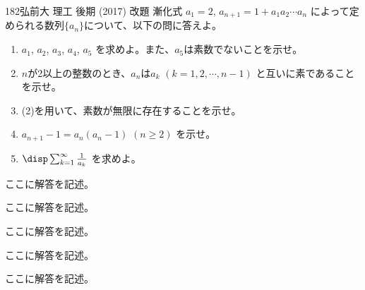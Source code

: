 \begin{thm}{182}{}{弘前大 理工 後期 (2017) 改題}
 漸化式 $a_1=2$, $a_{n+1}=1+a_1a_2\cdots a_n$ によって定められる数列$\{a_n\}$について、以下の問に答えよ。
 \begin{enumerate}
  \item $a_1$, $a_2$, $a_3$, $a_4$, $a_5$ を求めよ。また、$a_5$は素数でないことを示せ。
  \item $n$が2以上の整数のとき、$a_n$は$a_k$ $(k=1, 2, \cdots, n-1)$ と互いに素であることを示せ。
  \item (2)を用いて、素数が無限に存在することを示せ。
  \item $a_{n+1}-1=a_n(a_n-1)$ $(n\ge 2)$ を示せ。
  \item $\disp \sum_{k=1}^\infty \frac{1}{a_k}$ を求めよ。
 \end{enumerate}
\end{thm}

ここに解答を記述。

ここに解答を記述。

ここに解答を記述。

ここに解答を記述。

ここに解答を記述。